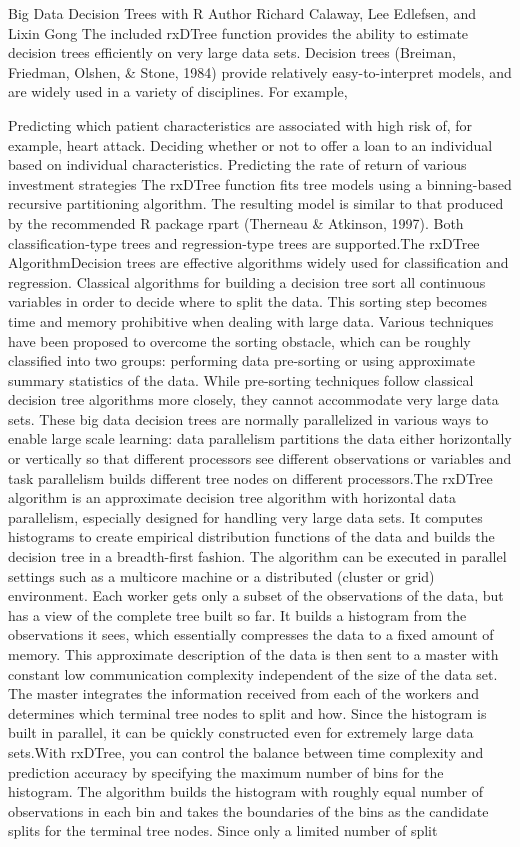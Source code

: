 Big Data Decision Trees with R
Author Richard Calaway, Lee Edlefsen, and Lixin Gong
The included rxDTree function provides the ability to estimate decision trees efficiently on very large data sets. 
Decision trees (Breiman, Friedman, Olshen, & Stone, 1984) provide relatively easy-to-interpret models, and are widely used in a variety of disciplines.  For example,

Predicting which patient characteristics are associated with high risk of, for example, heart attack.
Deciding whether or not to offer a loan to an individual based on individual characteristics.
Predicting the rate of return of various investment strategies
The rxDTree function fits tree models using a binning-based recursive partitioning algorithm. The resulting model is similar to that produced by the recommended R package rpart (Therneau & Atkinson, 1997). Both classification-type trees and regression-type trees are supported.The rxDTree AlgorithmDecision trees are effective algorithms widely used for classification and regression. Classical algorithms for building a decision tree sort all continuous variables in order to decide where to split the data. This sorting step becomes time and memory prohibitive when dealing with large data. Various techniques have been proposed to overcome the sorting obstacle, which can be roughly classified into two groups: performing data pre-sorting or using approximate summary statistics of the data. While pre-sorting techniques follow classical decision tree algorithms more closely, they cannot accommodate very large data sets. These big data decision trees are normally parallelized in various ways to enable large scale learning: data parallelism partitions the data either horizontally or vertically so that different processors see different observations or variables and task parallelism builds different tree nodes on different processors.The rxDTree algorithm is an approximate decision tree algorithm with horizontal data parallelism, especially designed for handling very large data sets. It computes histograms to create empirical distribution functions of the data and builds the decision tree in a breadth-first fashion. The algorithm can be executed in parallel settings such as a multicore machine or a distributed (cluster or grid) environment. Each worker gets only a subset of the observations of the data, but has a view of the complete tree built so far. It builds a histogram from the observations it sees, which essentially compresses the data to a fixed amount of memory. This approximate description of the data is then sent to a master with constant low communication complexity independent of the size of the data set. The master integrates the information received from each of the workers and determines which terminal tree nodes to split and how. Since the histogram is built in parallel, it can be quickly constructed even for extremely large data sets.With rxDTree, you can control the balance between time complexity and prediction accuracy by specifying the maximum number of bins for the histogram. The algorithm builds the histogram with roughly equal number of observations in each bin and takes the boundaries of the bins as the candidate splits for the terminal tree nodes. Since only a limited number of split 